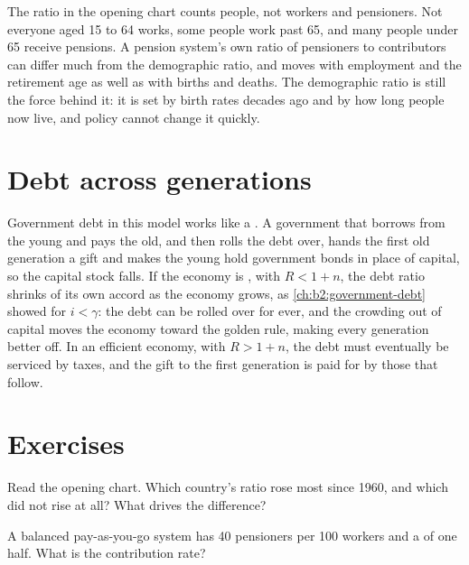 \begin{measure}
The ratio in the opening chart counts people, not workers and pensioners. Not everyone aged 15 to 64 works, some people
work past 65, and many people under 65 receive pensions. A pension system's own ratio of pensioners to contributors can
differ much from the demographic ratio, and moves with employment and the retirement age as well as with births and
deaths. The demographic ratio is still the force behind it: it is set by birth rates decades ago and by how long people
now live, and policy cannot change it quickly.
\end{measure}

\section{Debt across generations}\label{sec:b2:overlapping-generations:debt}

Government debt in this model works like a . A government that borrows from the young and pays the
old, and then rolls the debt over, hands the first old generation a gift and makes the young hold government bonds in
place of capital, so the capital stock falls. If the economy is , with $R < 1 + n$, the debt ratio shrinks of its
own accord as the economy grows, as \cref{ch:b2:government-debt} showed for $i < \gamma$: the debt can be rolled over for ever, and the crowding out of capital
moves the economy toward the golden rule, making every generation better off. In an efficient economy, with $R > 1 + n$, the
debt must eventually be serviced by taxes, and the gift to the first generation is paid for by those that follow.

\section{Exercises}\label{sec:b2:overlapping-generations:exercises}

\begin{exercise}[$\star$]\label{exo:b2:overlapping-generations:1}
Read the opening chart. Which country's ratio rose most since 1960, and which did not rise at all? What drives the
difference?
\end{exercise}

\begin{exercise}[$\star$]\label{exo:b2:overlapping-generations:2}
A balanced pay-as-you-go system has 40 pensioners per 100 workers and a  of one half. What is the
contribution rate?
\end{exercise}

